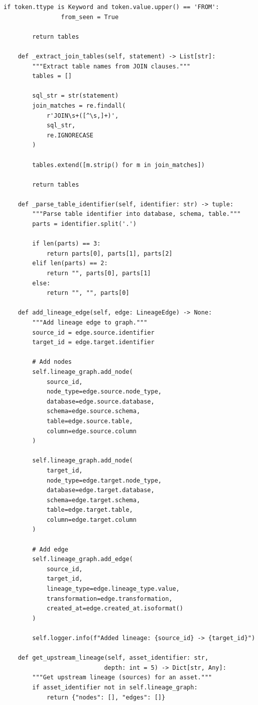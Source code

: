 \begin{lstlisting}[style=python, caption=LineageTracker with Column-Level Dependencies]
            if token.ttype is Keyword and token.value.upper() == 'FROM':
                from_seen = True

        return tables

    def _extract_join_tables(self, statement) -> List[str]:
        """Extract table names from JOIN clauses."""
        tables = []

        sql_str = str(statement)
        join_matches = re.findall(
            r'JOIN\s+([^\s,]+)',
            sql_str,
            re.IGNORECASE
        )

        tables.extend([m.strip() for m in join_matches])

        return tables

    def _parse_table_identifier(self, identifier: str) -> tuple:
        """Parse table identifier into database, schema, table."""
        parts = identifier.split('.')

        if len(parts) == 3:
            return parts[0], parts[1], parts[2]
        elif len(parts) == 2:
            return "", parts[0], parts[1]
        else:
            return "", "", parts[0]

    def add_lineage_edge(self, edge: LineageEdge) -> None:
        """Add lineage edge to graph."""
        source_id = edge.source.identifier
        target_id = edge.target.identifier

        # Add nodes
        self.lineage_graph.add_node(
            source_id,
            node_type=edge.source.node_type,
            database=edge.source.database,
            schema=edge.source.schema,
            table=edge.source.table,
            column=edge.source.column
        )

        self.lineage_graph.add_node(
            target_id,
            node_type=edge.target.node_type,
            database=edge.target.database,
            schema=edge.target.schema,
            table=edge.target.table,
            column=edge.target.column
        )

        # Add edge
        self.lineage_graph.add_edge(
            source_id,
            target_id,
            lineage_type=edge.lineage_type.value,
            transformation=edge.transformation,
            created_at=edge.created_at.isoformat()
        )

        self.logger.info(f"Added lineage: {source_id} -> {target_id}")

    def get_upstream_lineage(self, asset_identifier: str,
                            depth: int = 5) -> Dict[str, Any]:
        """Get upstream lineage (sources) for an asset."""
        if asset_identifier not in self.lineage_graph:
            return {"nodes": [], "edges": []}


\end{lstlisting}
